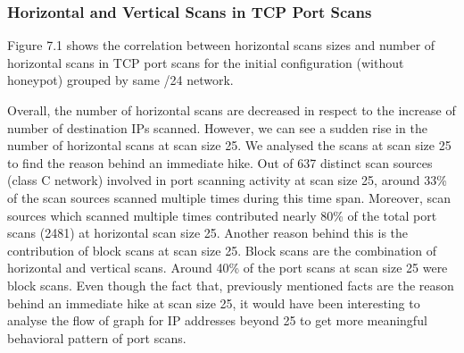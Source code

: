 \subsubsection{Horizontal and Vertical Scans in TCP Port Scans}
Figure 7.1 shows the correlation between horizontal scans sizes and number of horizontal scans in TCP port scans for the initial configuration (without honeypot) grouped by same /24 network.
\begin{table}[t!]
    \centering
    \caption{Number of Horizontal and Vertical scans in TCP Port Scans for Two Datasets and its Counts}
\end{table}
Overall, the number of horizontal scans are decreased in respect to the increase of number of destination IPs scanned.
However, we can see a sudden rise in the number of horizontal scans at scan size 25.
We analysed the scans at scan size 25 to find the reason behind an immediate hike.
Out of 637 distinct scan sources (class C network) involved in port scanning activity at scan size 25, around 33\% of the scan sources scanned multiple times during this time span.
Moreover, scan sources which scanned multiple times contributed nearly 80\% of the total port scans (2481) at horizontal scan size 25.
Another reason behind this is the contribution of block scans at scan size 25.
Block scans are the combination of horizontal and vertical scans.
Around 40\% of the port scans at scan size 25 were block scans.
Even though the fact that, previously mentioned facts are the reason behind an immediate hike at scan size 25, it would have been interesting to analyse the flow of graph for IP addresses beyond 25 to get more meaningful behavioral pattern of port scans.
